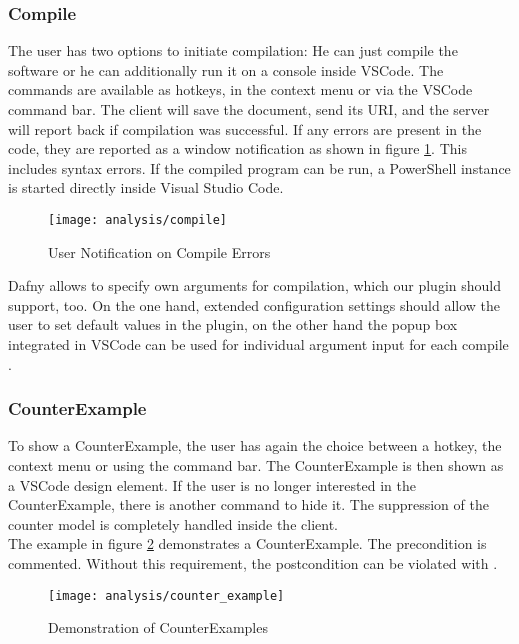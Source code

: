 \subsubsection{Compile}
The user has two options to initiate compilation: He can just compile the software or he can additionally run it on a console inside VSCode.
The commands are available as hotkeys, in the context menu or via the VSCode command bar.
The client will save the document, send its URI, and the server will report back if compilation was successful.
If any errors are present in the code, they are reported as a window notification as shown in figure \ref{fig:analysis_compile}.
This includes syntax errors. If the compiled program can be run, a PowerShell instance is started directly inside Visual Studio Code.

\begin{figure}[H]
    \centering
    \texttt{[image: analysis/compile]}
    \caption{User Notification on Compile Errors}
    \label{fig:analysis_compile}
\end{figure}

Dafny allows to specify own arguments for compilation, which our plugin should support, too.
On the one hand, extended configuration settings should allow the user to set default values in the plugin, on the other hand the popup box integrated in VSCode can be used for individual argument input for each compile \cite{vscodeAPI}.

\subsubsection{CounterExample}
To show a CounterExample, the user has again the choice between a hotkey, the context menu or using the command bar.
The CounterExample is then shown as a VSCode design element.
If the user is no longer interested in the CounterExample, there is another command to hide it.
The suppression of the counter model is completely handled inside the client. \\

The example in figure \ref{fig:analysis_counter_example} demonstrates a CounterExample.
The precondition is commented. Without this requirement, the postcondition can be violated with .

\begin{figure}[H]
    \centering
    \texttt{[image: analysis/counter\_example]}
    \caption{Demonstration of CounterExamples}
    \label{fig:analysis_counter_example}
\end{figure}

